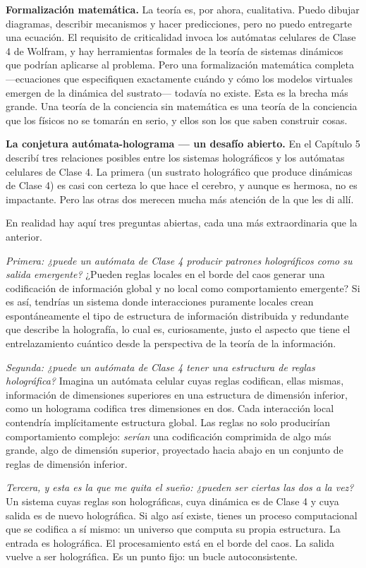 \documentclass[11pt, twoside, openright]{book}
\begin{document}
\textbf{Formalización matemática.} La teoría es, por ahora, cualitativa. Puedo dibujar diagramas, describir mecanismos y hacer predicciones, pero no puedo entregarte una ecuación. El requisito de criticalidad invoca los autómatas celulares de Clase 4 de Wolfram, y hay herramientas formales de la teoría de sistemas dinámicos que podrían aplicarse al problema. Pero una formalización matemática completa ---ecuaciones que especifiquen exactamente cuándo y cómo los modelos virtuales emergen de la dinámica del sustrato--- todavía no existe. Esta es la brecha más grande. Una teoría de la conciencia sin matemática es una teoría de la conciencia que los físicos no se tomarán en serio, y ellos son los que saben construir cosas.

\textbf{La conjetura autómata-holograma --- un desafío abierto.} En el Capítulo 5 describí tres relaciones posibles entre los sistemas holográficos y los autómatas celulares de Clase 4. La primera (un sustrato holográfico que produce dinámicas de Clase 4) es casi con certeza lo que hace el cerebro, y aunque es hermosa, no es impactante. Pero las otras dos merecen mucha más atención de la que les di allí.

En realidad hay aquí tres preguntas abiertas, cada una más extraordinaria que la anterior.

\textit{Primera: ¿puede un autómata de Clase 4 producir patrones holográficos como su salida emergente?} ¿Pueden reglas locales en el borde del caos generar una codificación de información global y no local como comportamiento emergente? Si es así, tendrías un sistema donde interacciones puramente locales crean espontáneamente el tipo de estructura de información distribuida y redundante que describe la holografía, lo cual es, curiosamente, justo el aspecto que tiene el entrelazamiento cuántico desde la perspectiva de la teoría de la información.

\textit{Segunda: ¿puede un autómata de Clase 4 tener una estructura de reglas holográfica?} Imagina un autómata celular cuyas reglas codifican, ellas mismas, información de dimensiones superiores en una estructura de dimensión inferior, como un holograma codifica tres dimensiones en dos. Cada interacción local contendría implícitamente estructura global. Las reglas no solo producirían comportamiento complejo: \textit{serían} una codificación comprimida de algo más grande, algo de dimensión superior, proyectado hacia abajo en un conjunto de reglas de dimensión inferior.

\textit{Tercera, y esta es la que me quita el sueño: ¿pueden ser ciertas las dos a la vez?} Un sistema cuyas reglas son holográficas, cuya dinámica es de Clase 4 y cuya salida es de nuevo holográfica. Si algo así existe, tienes un proceso computacional que se codifica a sí mismo: un universo que computa su propia estructura. La entrada es holográfica. El procesamiento está en el borde del caos. La salida vuelve a ser holográfica. Es un punto fijo: un bucle autoconsistente.
\end{document}
